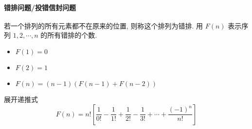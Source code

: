 \paragraph{错排问题/投错信封问题}
\begin{defination}[错排公式]
若一个排列的所有元素都不在原来的位置, 则称这个排列为错排. 用 $F(n)$ 表示序列
$1, 2, \cdots, n$ 的所有错排的个数.
\begin{itemize}
\item $F(1) = 0$
\item $F(2) = 1$
\item $F(n) = (n-1)(F(n-1) + F(n-2))$
\end{itemize}
展开递推式
\[
F(n) = n! \left[\frac{1}{0!} - \frac{1}{1!} + \frac{1}{2!} - \frac{1}{3!}
    + \cdots + \frac{(-1)^{n}}{n!}\right]
\]
\end{defination}
\endinput
